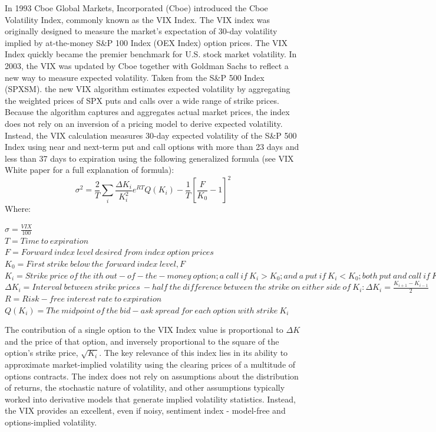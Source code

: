 \documentclass[11pt,a4paper,oldfontcommands]{memoir}
\begin{document}
{In 1993 Cboe Global Markets, Incorporated (Cboe) introduced the Cboe Volatility Index, commonly known as the VIX Index. The VIX index was originally designed to measure the market’s expectation of 30-day volatility implied by at-the-money S\&P 100 Index (OEX Index) option prices. The VIX Index quickly became the premier benchmark for U.S. stock market volatility. In 2003, the VIX was updated by Cboe together with Goldman Sachs to reflect a new way to measure expected volatility. Taken from the S\&P 500 Index (SPXSM). the new VIX algorithm estimates expected volatility by aggregating the weighted prices of SPX puts and calls over a wide range of strike prices. Because the algorithm captures and aggregates actual market prices, the index does not rely on an inversion of a pricing model to derive expected volatility. Instead, the VIX calculation measures 30-day expected volatility of the S\&P 500 Index using near and next-term put and call options with more than 23 days and less than 37 days to expiration using the following generalized formula (see VIX White paper for a full explanation of formula):
\[\sigma^2 =\frac{2}{T}\sum_i{\frac{\Delta{K_i}}{K^2_i}e^{RT}Q(K_i) -\frac{1}{T}[\frac{F}{K_0}-1]^2}\]
Where: 
\begin{flushleft}
$\sigma = \frac{VIX}{100}$\\
$T = Time\ to\ expiration$\\
$F = Forward\ index\ level\ desired\ from\ index\ option\ prices$\\
$K_0 = First\ strike\ below\ the\ forward\ index\ level, F$\\
$K_i= Strike\ price\ of\ the\ ith\ out-of-the-money\ option; a\ call\ if\ K_i>K_0; and\ a\ put\ if\ K_i<K_0; both\ put\ and\ call\ if\ K_i=K_0.$\\
$\Delta{K_i} = Interval\ between\ strike\ prices\ - half\ the\ difference\ between\ the\ strike\ on\ either\ side\ of\ K_i: \Delta{K_i} = \frac{K_{i+1}-K_{i-1}}{2}$\\
$R = Risk-free\ interest\ rate\ to\ expiration$\\
$Q(K_i) = The\ midpoint\ of\ the\ bid-ask\ spread\ for\ each\ option\ with\ strike\ K_i$\\
\end{flushleft}
The contribution of a single option to the VIX Index value is proportional to $\Delta K$ and the price of that option, and inversely proportional to the square of the option’s strike price, $\sqrt{K_i}$. The key relevance of this index lies in its ability to approximate market-implied volatility using the clearing prices of a multitude of options contracts. The index does not rely on assumptions about the distribution of returns, the stochastic nature of volatility, and other assumptions typically worked into derivative models that generate implied volatility statistics. Instead, the VIX provides an excellent, even if noisy, sentiment index - model-free and options-implied volatility.

}
\end{document}
